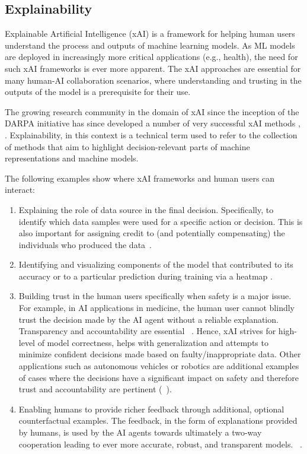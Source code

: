\documentclass[twoside,11pt]{article}
\begin{document}
\subsection{Explainability}

Explainable Artificial Intelligence (xAI) is a framework for helping human users understand the process and outputs of machine learning models. As ML models are deployed in increasingly more critical applications (e.g., health), the need for such xAI frameworks is ever more apparent. The xAI approaches are essential for many human-AI collaboration scenarios, where understanding and trusting in the outputs of the model is a prerequisite for their use.  

The growing research community in the domain of xAI since the inception of the DARPA initiative \cite{GunningAha:2019:DARPA} has since developed a number of very successful xAI methods \cite{ZhouEtAl:2021:QualitySurvey}, \cite{HolzWoj:2022:XAIOverview}. Explainability, in this context is a technical term used to refer to the collection of methods that aim to highlight decision-relevant parts of machine representations and machine models.

The following examples show where xAI frameworks and human users can interact:
\begin{enumerate}
\item Explaining the role of data source in the final decision. Specifically, to identify which data samples were used for a specific action or decision. This is also important for assigning credit to (and potentially compensating) the individuals who produced the data~\cite{zanzotto2019human}. 
\item Identifying and visualizing components of the model that contributed to its accuracy or to a particular prediction during training via a heatmap \cite{SturmEtAl:2015:InteractiveHeatmap}.
\item Building trust in the human users specifically when safety is a major issue. For example, in AI applications in medicine, the human user cannot blindly trust the decision made by the AI agent without a reliable explanation. Transparency and accountability are essential ~\cite{Schneeberger:2020:legalAI, Stoeger:2021:MedicalAI}. Hence, xAI strives for high-level of model correctness, helps with generalization and attempts to minimize confident decisions made based on faulty/inappropriate data. Other applications such as autonomous vehicles or robotics are additional examples of cases where the decisions have a significant impact on safety and therefore trust and accountability are pertinent (~\cite{araiza2019safe, wells:2021:explainable}).
\item Enabling humans to provide richer feedback through additional, optional counterfactual examples. The feedback, in the form of explanations provided by humans, is used by the AI agents towards ultimately a two-way cooperation leading to ever more accurate, robust, and transparent models. ~\cite{Karalus:2021:HITL-counterfactuals,PuiuttaVeith:2020:xAIRLSurvey}.   
\end{enumerate}
\end{document}
